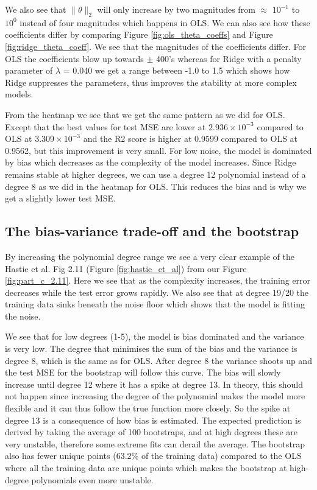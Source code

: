 \documentclass[reprint,english,notitlepage]{revtex4-2}  %
\begin{document}
We also see that $\|\theta\|_2$ will only increase by two magnitudes from $\approx$ $10^{-1}$ to $10^0$ instead of four magnitudes which happens in OLS. We can also see how these coefficients differ by comparing Figure \ref{fig:ols_theta_coeffs} and Figure \ref{fig:ridge_theta_coeff}. We see that the magnitudes of the coefficients differ. For OLS the coefficients blow up towards $\pm$ 400's whereas for Ridge with a penalty parameter of $\lambda$ = 0.040 we get a range between -1.0 to 1.5 which shows how Ridge suppresses the parameters, thus improves the stability at more complex models.


From the heatmap we see that we get the same pattern as we did for OLS. Except that the best values for test MSE are lower at $2.936 \times 10^{-3}$ compared to OLS at $3.309 \times 10^{-3}$ and the R2 score is higher at 0.9599 compared to OLS at 0.9562, but this improvement is very small. For low noise, the model is dominated by bias which decreases as the complexity of the model increases. Since Ridge remains stable at higher degrees, we can use a degree 12 polynomial instead of a degree 8 as we did in the heatmap for OLS. This reduces the bias and is why we get a slightly lower test MSE.


\subsection{The bias-variance trade-off and the bootstrap}%
By increasing the polynomial degree range we see a very clear example of the Hastie et al. Fig 2.11 (Figure \ref{fig:hastie_et_al}) from our Figure \ref{fig:part_c_2.11}. Here we see that as the complexity increases, the training error decreases while the test error grows rapidly. We also see that at degree 19/20 the training data sinks beneath the noise floor which shows that the model is fitting the noise.

We see that for low degrees (1-5), the model is bias dominated and the variance is very low. The degree that minimises the sum of the bias and the variance is degree 8, which is the same as for OLS. After degree 8 the variance shoots up and the test MSE for the bootstrap will follow this curve. The bias will slowly increase until degree 12 where it has a spike at degree 13. In theory, this should not happen since increasing the degree of the polynomial makes the model more flexible and it can thus follow the true function more closely. So the spike at degree 13 is a consequence of how bias is estimated. The expected prediction is derived by taking the average of 100 bootstraps, and at high degrees these are very unstable, therefore some extreme fits can derail the average. The bootstrap also has fewer unique points ($63.2\%$ of the training data) compared to the OLS where all the training data are unique points which makes the bootstrap at high-degree polynomials even more unstable.
\end{document}
